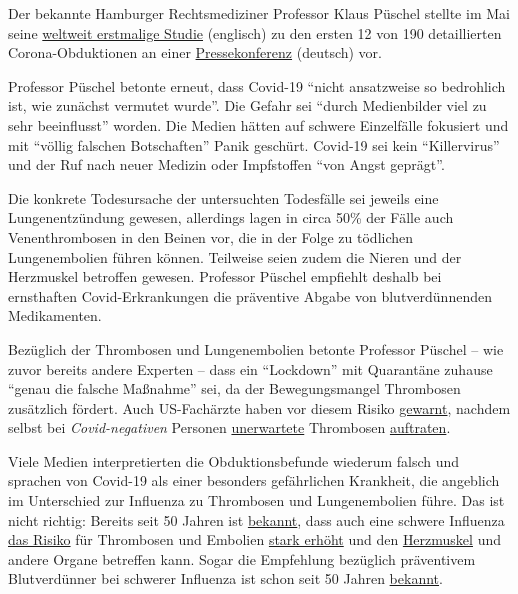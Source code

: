 Der bekannte Hamburger Rechtsmediziner Professor Klaus Püschel stellte
im Mai seine
\href{https://www.acpjournals.org/doi/10.7326/M20-2003}{weltweit
erstmalige Studie} (englisch) zu den ersten 12 von 190 detaillierten
Corona-Obduktionen an einer
\href{https://www.youtube.com/watch?v=GXhxorBBPYI}{Pressekonferenz}
(deutsch) vor.

Professor Püschel betonte erneut, dass Covid-19 ``nicht ansatzweise so
bedrohlich ist, wie zunächst vermutet wurde''. Die Gefahr sei ``durch
Medienbilder viel zu sehr beeinflusst'' worden. Die Medien hätten auf
schwere Einzelfälle fokusiert und mit ``völlig falschen Botschaften''
Panik geschürt. Covid-19 sei kein ``Killervirus'' und der Ruf nach neuer
Medizin oder Impfstoffen ``von Angst geprägt''.

Die konkrete Todesursache der untersuchten Todesfälle sei jeweils eine
Lungenentzündung gewesen, allerdings lagen in circa 50\% der Fälle auch
Venenthrombosen in den Beinen vor, die in der Folge zu tödlichen
Lungenembolien führen können. Teilweise seien zudem die Nieren und der
Herzmuskel betroffen gewesen. Professor Püschel empfiehlt deshalb bei
ernsthaften Covid-Erkrankungen die präventive Abgabe von
blutverdünnenden Medikamenten.

Bezüglich der Thrombosen und Lungenembolien betonte Professor Püschel --
wie zuvor bereits andere Experten -- dass ein ``Lockdown'' mit
Quarantäne zuhause ``genau die falsche Maßnahme'' sei, da der
Bewegungsmangel Thrombosen zusätzlich fördert. Auch US-Fachärzte haben
vor diesem Risiko
\href{https://twitter.com/AlexBerenson/status/1258625618431954945}{gewarnt},
nachdem selbst bei \emph{Covid-negativen} Personen
\href{https://twitter.com/AlexBerenson/status/1259634922161147910}{unerwartete}
Thrombosen
\href{https://twitter.com/AlexBerenson/status/1259548620724080640}{auftraten}.

Viele Medien interpretierten die Obduktionsbefunde wiederum falsch und
sprachen von Covid-19 als einer besonders gefährlichen Krankheit, die
angeblich im Unterschied zur Influenza zu Thrombosen und Lungenembolien
führe. Das ist nicht richtig: Bereits seit 50 Jahren ist
\href{https://www.thieme-connect.com/products/ejournals/abstract/10.1055/s-0028-1108874}{bekannt},
dass auch eine schwere Influenza
\href{https://www.sciencedaily.com/releases/2009/10/091014111549.htm}{das
Risiko} für Thrombosen und Embolien
\href{https://www.ejinme.com/article/S0953-6205(15)00284-8/pdf}{stark
erhöht} und den
\href{https://academic.oup.com/ije/article-abstract/7/3/231/755276}{Herzmuskel}
und andere Organe betreffen kann. Sogar die Empfehlung bezüglich
präventivem Blutverdünner bei schwerer Influenza ist schon seit 50
Jahren
\href{https://www.thieme-connect.com/products/ejournals/abstract/10.1055/s-0028-1108874}{bekannt}.

